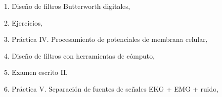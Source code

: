 \begin{enumerate}
  \item Diseño de filtros Butterworth digitales, 
  \item Ejercicios, 
  \item Práctica IV. Procesamiento de potenciales de membrana celular, 
  \item Diseño de filtros con herramientas de cómputo, 
  \item Examen escrito II, 
  \item Práctica V. Separación de fuentes de señales EKG + EMG + ruido,
\end{enumerate}